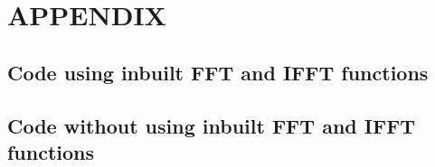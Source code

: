 \documentclass{article}
\begin{document}


\onecolumn
\section{APPENDIX}
\subsection{Code using inbuilt FFT and IFFT functions }

\subsection{Code  without using inbuilt FFT and IFFT functions }

\end{document}
